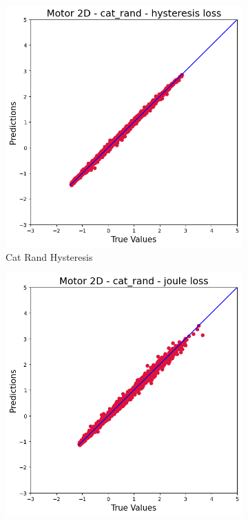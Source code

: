 \documentclass{article}
\begin{document}
\begin{figure}[!htbp]
    \vspace{0.3cm}
    
    \begin{subfigure}[b]{0.23\textwidth}
        \centering
        \null
    \end{subfigure}
    \hfill
    \centering
    \begin{subfigure}[b]{0.23\textwidth}
        \centering
        \includegraphics[width=\textwidth]{images/2D/cat_rand_hysteresis.png}
        \caption{Cat Rand Hysteresis}
    \end{subfigure}
    \hfill
    \begin{subfigure}[b]{0.23\textwidth}
        \centering
        \includegraphics[width=\textwidth]{images/2D/cat_rand_joule.png}

\end{subfigure}
\end{figure}
\end{document}
